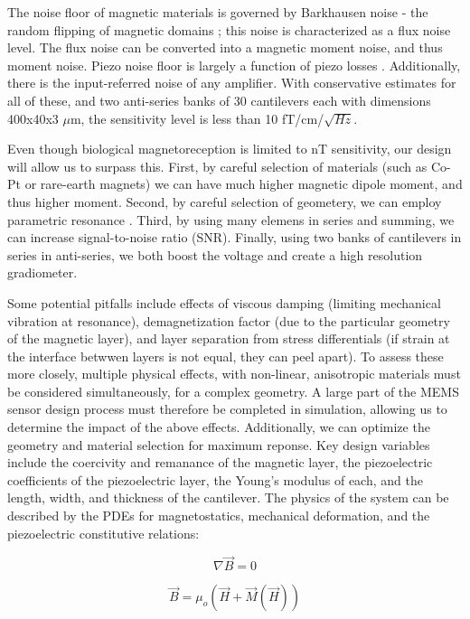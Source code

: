 The noise floor of magnetic materials is governed by Barkhausen noise - the random flipping of magnetic domains \cite{butta2012sources}; this noise is characterized as a flux noise level. The flux noise can be converted into a magnetic moment noise, and thus moment noise. Piezo noise floor is largely a function of piezo losses \cite{levinzon2004fundamental}. Additionally, there is the input-referred noise of any amplifier. With conservative estimates for all of these, and two anti-series banks of 30 cantilevers each with dimensions 400x40x3 $\mu$m, the sensitivity level is less than 10 fT/cm/$\sqrt{Hz}$.

 Even though biological magnetoreception is limited to nT sensitivity, our design will allow us to surpass this. First, by careful selection of materials (such as Co-Pt or rare-earth magnets) \cite{coey2010magnetism, arnold2009permanent} we can have much higher magnetic dipole moment, and thus higher moment. Second, by careful selection of geometery, we can employ parametric resonance \cite{van2006resonant}. Third, by using many elemens in series and summing, we can increase signal-to-noise ratio (SNR). Finally, using two banks of cantilevers in series in anti-series, we both boost the voltage and create a high resolution gradiometer.

 Some potential pitfalls include effects of viscous damping (limiting mechanical vibration at resonance), demagnetization factor (due to the particular geometry of the magnetic layer), and layer separation from stress differentials (if strain at the interface betwwen layers is not equal, they can peel apart). To assess these more closely, multiple physical effects, with non-linear, anisotropic materials must be considered simultaneously, for a complex geometry. A large part of the MEMS sensor design process must therefore be completed in simulation, allowing us to determine the impact of the above effects. Additionally, we can optimize the geometry and material selection for maximum reponse. Key design variables include the coercivity and remanance of the magnetic layer, the piezoelectric coefficients of the piezoelectric layer, the Young's modulus of each, and the length, width, and thickness of the cantilever. The physics of the system can be described by the PDEs for magnetostatics, mechanical deformation, and the piezoelectric constitutive relations:

 $$ \nabla \vec{B} = 0$$

 $$ \vec{B} = \mu_o(\vec{H}+\vec{M}(\vec{H}))$$

